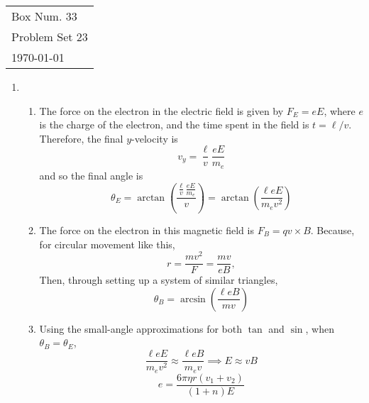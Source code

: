 \documentclass[10pt]{article}
\begin{document}
  \begin{tabular}{l}
    Box Num. 33 \\
    Problem Set 23 \\
    \today
  \end{tabular}

  \begin{enumerate}
    \item \begin{enumerate}
        \item The force on the electron in the electric field is given by $F_E = e E$, where $e$ is the charge of the electron, and the time spent in the field is $t=\ell/v$. Therefore, the final $y$-velocity is
        \begin{equation*}
            v_y = \frac{\ell}{v} \frac{e E}{m_e}
        \end{equation*}
        and so the final angle is
        \begin{equation*}
            \theta_E = \arctan \left(\frac{\frac{\ell}{v} \frac{e E}{m_e}}{v}\right) =
            \arctan \left(\frac{\ell e E}{m_e v^2}\right)
        \end{equation*}

        \item The force on the electron in this magnetic field is $F_B = qv\times B$. Because, for circular movement like this,
        \begin{equation*}
            r = \frac{mv^2}{F} = \frac{m v}{e B},
        \end{equation*}
        Then, through setting up a system of similar triangles,
        \begin{equation*}
            \theta_B = \arcsin\left(\frac{\ell e B}{m v}\right)
        \end{equation*}

        \item Using the small-angle approximations for both $\tan$ and $\sin$, when $\theta_B = \theta_E$,
        \begin{equation*}
            \frac{\ell e E}{m_e v^2} \approx \frac{\ell e B}{m_e v} \implies E \approx vB
        \end{equation*}
        \begin{equation*}
            e = \frac{6\pi \eta r (v_1+v_2)}{(1+n)E}
        \end{equation*}
    \end{enumerate}


\end{enumerate}
\end{document}
